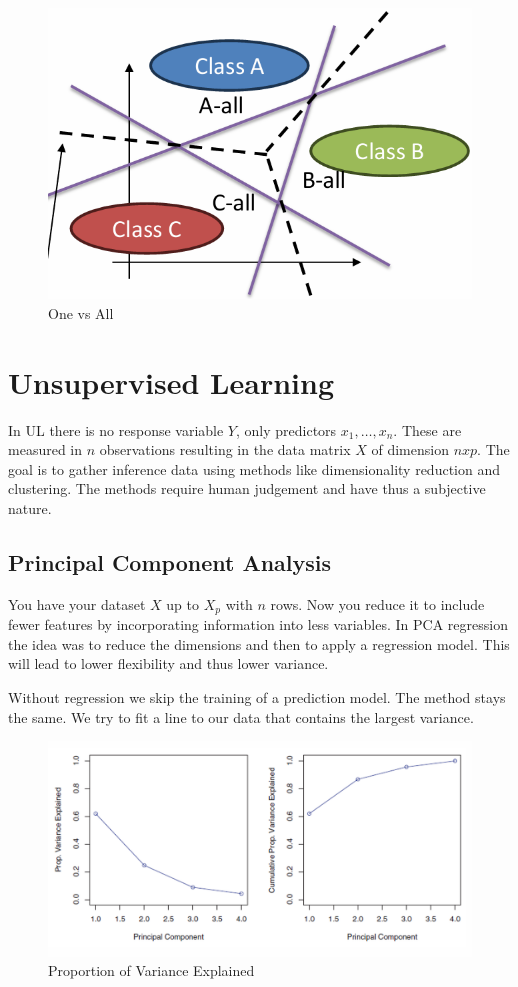 \documentclass[../Main.tex]{subfiles}
\begin{document}
\begin{figure}[H]
    \centering
    \includegraphics[width=0.6\linewidth]{Images/one-vs-all.png}
    \caption{One vs All}
\end{figure}

\newpage

\section{Unsupervised Learning}
In UL there is no response variable \(Y\), only
predictors \(x_1,\dots ,x_n\). These are measured in
\(n\) observations resulting in the data matrix \(X\)
of dimension \(nxp\). The goal is to gather
inference data using methods like dimensionality reduction
and clustering. The methods require human judgement and have
thus a subjective nature.

\subsection{Principal Component Analysis}
You have your dataset \(X\) up to \(X_p\) with \(n\) rows.
Now you reduce it to include fewer features by incorporating
information into less variables. In PCA regression the idea
was to reduce the dimensions and then to apply a regression model.
This will lead to lower flexibility and thus lower variance.

Without regression we skip the training of a prediction model.
The method stays the same. We try to fit a line to our data
that contains the largest variance.

\begin{figure}[H]
    \centering
    \includegraphics[width=0.6\linewidth]{Images/pve.png}
    \caption{Proportion of Variance Explained}
\end{figure}
\end{document}
